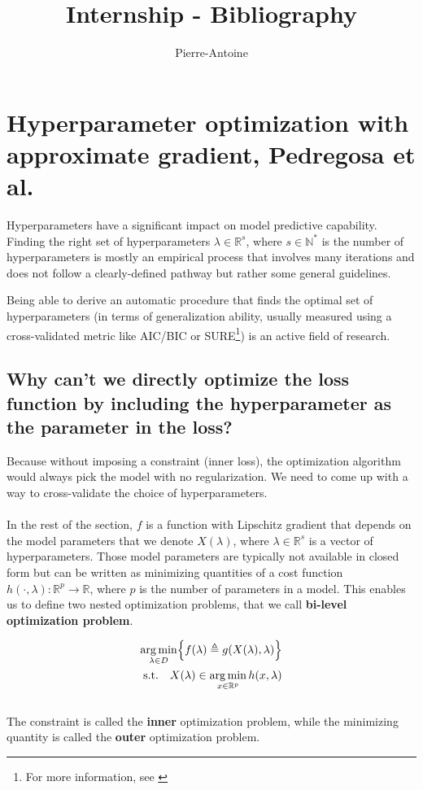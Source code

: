 \documentclass[a4paper,10pt]{article}
\author{Pierre-Antoine}
\title{Internship - Bibliography}
\theoremstyle{definition}
\begin{document}
\maketitle

\vskip 0.3in

\section{Hyperparameter optimization with approximate gradient, Pedregosa et al.}

Hyperparameters have a significant impact on model predictive capability. Finding the right set
of hyperparameters $\lambda \in \mathbb{R}^s$, where $s \in \mathbb{N}^*$ is the number of hyperparameters
is mostly an empirical process that involves many iterations and does not follow a clearly-defined pathway
but rather some general guidelines.

Being able to derive an automatic procedure that finds the optimal set of hyperparameters (in terms of generalization
ability, usually measured using a cross-validated metric like AIC/BIC or SURE\footnote{For more information, see \cite{Deledalle_Vaiter_Fadili_Peyre14}}) is an active field of research.

\subsection*{Why can't we directly optimize the loss function by including the hyperparameter as the parameter in the loss?}

Because without imposing a constraint (inner loss), the optimization algorithm would always pick the model with no regularization.
We need to come up with a way to cross-validate the choice of hyperparameters.
\\
\\
In the rest of the section, $f$ is a function with Lipschitz gradient that depends on the model
parameters that we denote $X(\lambda)$, where $\lambda \in \mathbb{R}^s$ is a vector of hyperparameters.
Those model parameters are typically not available in closed form but can be written as minimizing quantities of a cost function $h(\cdot, \lambda) : \mathbb{R}^p \rightarrow \mathbb{R}$,
where $p$ is the number of parameters in a model. This enables us to define two nested optimization problems, that we call
\textbf{bi-level optimization problem}.

\begin{align*}
    \operatorname*{arg\,min}_{\lambda \in D} \Bigl\{ f(\lambda) \triangleq g(X(\lambda), \lambda) \Bigr\} \\
    \text{s.t.} \quad X(\lambda) \in \operatorname*{arg\,min}_{x \in \mathbb{R}^p} h(x, \lambda)
\end{align*}
\\
The constraint is called the \textbf{inner} optimization problem, while the minimizing quantity is called the \textbf{outer} optimization problem.
\end{document}
